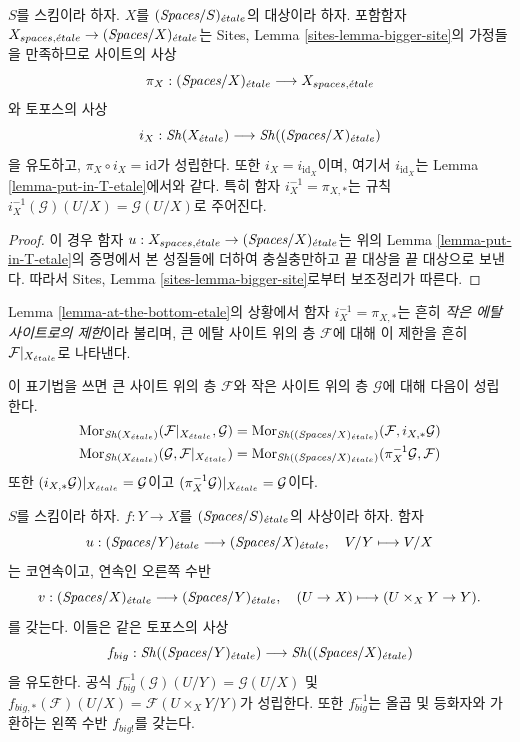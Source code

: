 \begin{lemma}
\label{lemma-at-the-bottom-etale}
$S$를 스킴이라 하자. $X$를 $(\textit{Spaces}/S)_{\acute{e}tale}$의 대상이라 하자.
포함함자 $X_{spaces, {\acute{e}tale}} \to (\textit{Spaces}/X)_{\acute{e}tale}$는 Sites,
Lemma \ref{sites-lemma-bigger-site}의 가정들을 만족하므로 사이트의 사상
$$
\pi_X :
(\textit{Spaces}/X)_{\acute{e}tale}
\longrightarrow
X_{spaces, {\acute{e}tale}}
$$
와 토포스의 사상
$$
i_X :
\mathop{\mathit{Sh}}\nolimits(X_{\acute{e}tale})
\longrightarrow
\mathop{\mathit{Sh}}\nolimits((\textit{Spaces}/X)_{\acute{e}tale})
$$
을 유도하고, $\pi_X \circ i_X = \text{id}$가 성립한다. 또한
$i_X = i_{\text{id}_X}$이며, 여기서 $i_{\text{id}_X}$는 Lemma
\ref{lemma-put-in-T-etale}에서와 같다. 특히 함자
$i_X^{-1} = \pi_{X, *}$는 규칙
$i_X^{-1}(\mathcal{G})(U/X) = \mathcal{G}(U/X)$로 주어진다.
\end{lemma}

\begin{proof}
이 경우 함자
$u : X_{spaces, {\acute{e}tale}} \to (\textit{Spaces}/X)_{\acute{e}tale}$는 위의 Lemma
\ref{lemma-put-in-T-etale}의 증명에서 본 성질들에 더하여 충실충만하고 끝
대상을 끝 대상으로 보낸다. 따라서 Sites, Lemma
\ref{sites-lemma-bigger-site}로부터 보조정리가 따른다.
\end{proof}

\begin{definition}
\label{definition-restriction-small-etale}
Lemma \ref{lemma-at-the-bottom-etale}의 상황에서 함자
$i_X^{-1} = \pi_{X, *}$는 흔히 {\it 작은 에탈 사이트로의 제한}이라
불리며, 큰 에탈 사이트 위의 층 $\mathcal{F}$에 대해 이 제한을 흔히
$\mathcal{F}|_{X_{\acute{e}tale}}$로 나타낸다.
\end{definition}

\noindent
이 표기법을 쓰면 큰 사이트 위의 층 $\mathcal{F}$와 작은 사이트 위의 층
$\mathcal{G}$에 대해 다음이 성립한다.
\begin{align*}
\mathop{\mathrm{Mor}}\nolimits_{\mathop{\mathit{Sh}}\nolimits(X_{\acute{e}tale})}(
\mathcal{F}|_{X_{\acute{e}tale}},
\mathcal{G})
& =
\mathop{\mathrm{Mor}}\nolimits_{\mathop{\mathit{Sh}}\nolimits((\textit{Spaces}/X)_{\acute{e}tale})}(
\mathcal{F},
i_{X, *}\mathcal{G}) \\
\mathop{\mathrm{Mor}}\nolimits_{\mathop{\mathit{Sh}}\nolimits(X_{\acute{e}tale})}(
\mathcal{G},
\mathcal{F}|_{X_{\acute{e}tale}})
& =
\mathop{\mathrm{Mor}}\nolimits_{\mathop{\mathit{Sh}}\nolimits((\textit{Spaces}/X)_{\acute{e}tale})}(
\pi_X^{-1}\mathcal{G},
\mathcal{F})
\end{align*}
또한 $(i_{X, *}\mathcal{G})|_{X_{\acute{e}tale}} = \mathcal{G}$이고
$(\pi_X^{-1}\mathcal{G})|_{X_{\acute{e}tale}} = \mathcal{G}$이다.

\begin{lemma}
\label{lemma-morphism-big-etale}
$S$를 스킴이라 하자. $f : Y \to X$를 $(\textit{Spaces}/S)_{\acute{e}tale}$의
사상이라 하자. 함자
$$
u :
(\textit{Spaces}/Y)_{\acute{e}tale}
\longrightarrow
(\textit{Spaces}/X)_{\acute{e}tale},
\quad
V/Y \longmapsto V/X
$$
는 코연속이고, 연속인 오른쪽 수반
$$
v :
(\textit{Spaces}/X)_{\acute{e}tale}
\longrightarrow
(\textit{Spaces}/Y)_{\acute{e}tale},
\quad
(U \to X) \longmapsto (U \times_X Y \to Y).
$$
를 갖는다. 이들은 같은 토포스의 사상
$$
f_{big} :
\mathop{\mathit{Sh}}\nolimits((\textit{Spaces}/Y)_{\acute{e}tale})
\longrightarrow
\mathop{\mathit{Sh}}\nolimits((\textit{Spaces}/X)_{\acute{e}tale})
$$
을 유도한다. 공식
$f_{big}^{-1}(\mathcal{G})(U/Y) = \mathcal{G}(U/X)$ 및
$f_{big, *}(\mathcal{F})(U/X) = \mathcal{F}(U \times_X Y/Y)$가 성립한다.
또한 $f_{big}^{-1}$는 올곱 및 등화자와 가환하는 왼쪽 수반 $f_{big!}$를
갖는다.
\end{lemma}

